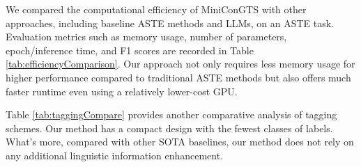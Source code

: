 \documentclass[11pt]{article}
\begin{document}


We compared the computational efficiency of MiniConGTS with other approaches, including baseline ASTE methods and LLMs, on an ASTE task. Evaluation metrics such as memory usage, number of parameters, epoch/inference time, and F1 scores are recorded in Table \ref{tab:efficiencyComparison}. Our approach not only requires less memory usage for higher performance compared to traditional ASTE methods but also offers much faster runtime even using a relatively lower-cost GPU. 


Table \ref{tab:taggingCompare} provides another comparative analysis of tagging schemes. Our method has a compact design with the fewest classes of labels. What's more, compared with other SOTA baselines, our method does not rely on any additional linguistic information enhancement.

\end{document}

